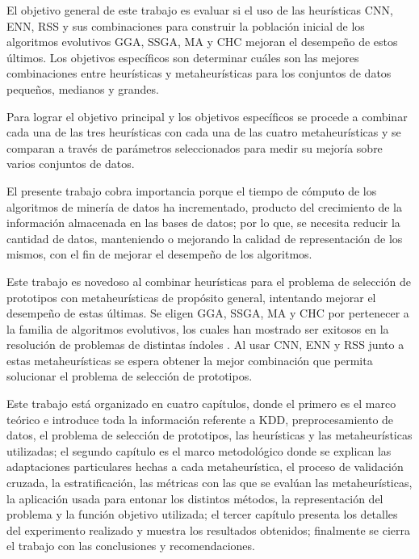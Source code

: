 
El objetivo general de este trabajo es evaluar si el uso de las heurísticas CNN, ENN, RSS y sus combinaciones para construir la población inicial de los algoritmos evolutivos GGA, SSGA, MA y CHC  mejoran el desempeño de estos últimos. Los objetivos específicos son determinar cuáles son las mejores combinaciones entre heurísticas y metaheurísticas para los conjuntos de datos pequeños, medianos y grandes.

Para lograr el objetivo principal y los objetivos específicos se procede a combinar cada una de las tres heurísticas con cada una de las cuatro metaheurísticas y se comparan a través de parámetros seleccionados para medir su mejoría sobre varios conjuntos de datos. 

El presente trabajo cobra importancia porque el tiempo de cómputo de los algoritmos de minería de datos ha incrementado, producto del crecimiento de la información almacenada en las bases de datos; por lo que, se necesita reducir la cantidad de datos, manteniendo o mejorando la calidad de representación de los mismos, con el fin de mejorar el desempeño de los algoritmos.

Este trabajo es novedoso al combinar heurísticas para el problema de selección de prototipos con metaheurísticas de propósito general, intentando mejorar el desempeño de estas últimas. Se eligen GGA, SSGA, MA y CHC por pertenecer a la familia de algoritmos evolutivos, los cuales han mostrado ser exitosos en la resolución de problemas de distintas índoles \cite{han2011data}. Al usar CNN, ENN y RSS junto a estas metaheurísticas se espera obtener la mejor combinación que permita solucionar el problema de selección de prototipos.

Este trabajo está organizado en cuatro capítulos, donde el primero es el marco teórico e introduce toda la información referente a KDD, preprocesamiento de datos, el problema de selección de prototipos, las heurísticas y las metaheurísticas utilizadas; el segundo capítulo es el marco metodológico donde se explican las adaptaciones particulares hechas a cada metaheurística, el proceso de validación cruzada, la estratificación, las métricas con las que se evalúan las metaheurísticas, la aplicación usada para entonar los distintos métodos, la representación del problema y la función objetivo utilizada; el tercer capítulo presenta los detalles del experimento realizado y muestra los resultados obtenidos; finalmente se cierra el trabajo con las conclusiones y recomendaciones.